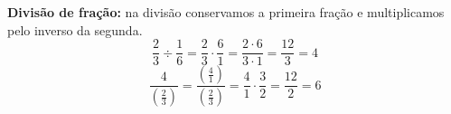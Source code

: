  \vskip0.3cm
 \begin{exem}
  \textbf{Divisão de fração:} na divisão conservamos a primeira fração e multiplicamos pelo inverso da segunda.
\begin{equation*}
\frac{2}{3} \div \frac{1}{6}= \frac{2}{3} \cdot \frac{6}{1}= \frac{2 \cdot 6}{3 \cdot 1}= \frac{12}{3}= 4 
\end{equation*}
\begin{equation*}
\frac{4}{\left(\frac{2}{3}\right)}= \frac{\left(\frac{4}{1}\right)}{\left(\frac{2}{3}\right)} = \frac{4}{1} \cdot \frac{3}{2}= \frac{12}{2}=6
\end{equation*}
 \end{exem}







